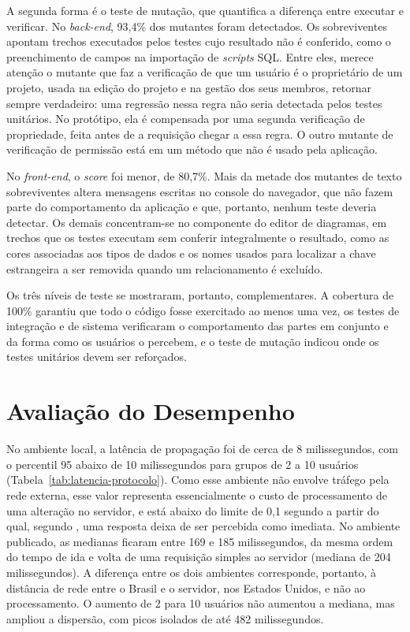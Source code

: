 A segunda forma é o teste de mutação, que quantifica a diferença entre executar e verificar. No \textit{back-end}, 93,4\% dos mutantes foram detectados. Os sobreviventes apontam trechos executados pelos testes cujo resultado não é conferido, como o preenchimento de campos na importação de \textit{scripts} SQL. Entre eles, merece atenção o mutante que faz a verificação de que um usuário é o proprietário de um projeto, usada na edição do projeto e na gestão dos seus membros, retornar sempre verdadeiro: uma regressão nessa regra não seria detectada pelos testes unitários. No protótipo, ela é compensada por uma segunda verificação de propriedade, feita antes de a requisição chegar a essa regra. O outro mutante de verificação de permissão está em um método que não é usado pela aplicação.

No \textit{front-end}, o \textit{score} foi menor, de 80,7\%. Mais da metade dos mutantes de texto sobreviventes altera mensagens escritas no console do navegador, que não fazem parte do comportamento da aplicação e que, portanto, nenhum teste deveria detectar. Os demais concentram-se no componente do editor de diagramas, em trechos que os testes executam sem conferir integralmente o resultado, como as cores associadas aos tipos de dados e os nomes usados para localizar a chave estrangeira a ser removida quando um relacionamento é excluído.

Os três níveis de teste se mostraram, portanto, complementares. A cobertura de 100\% garantiu que todo o código fosse exercitado ao menos uma vez, os testes de integração e de sistema verificaram o comportamento das partes em conjunto e da forma como os usuários o percebem, e o teste de mutação indicou onde os testes unitários devem ser reforçados.

\section{Avaliação do Desempenho}
\label{sec:avaliacao-desempenho}

No ambiente local, a latência de propagação foi de cerca de 8 milissegundos, com o percentil 95 abaixo de 10 milissegundos para grupos de 2 a 10 usuários (Tabela~\ref{tab:latencia-protocolo}). Como esse ambiente não envolve tráfego pela rede externa, esse valor representa essencialmente o custo de processamento de uma alteração no servidor, e está abaixo do limite de 0,1 segundo a partir do qual, segundo , uma resposta deixa de ser percebida como imediata. No ambiente publicado, as medianas ficaram entre 169 e 185 milissegundos, da mesma ordem do tempo de ida e volta de uma requisição simples ao servidor (mediana de 204 milissegundos). A diferença entre os dois ambientes corresponde, portanto, à distância de rede entre o Brasil e o servidor, nos Estados Unidos, e não ao processamento. O aumento de 2 para 10 usuários não aumentou a mediana, mas ampliou a dispersão, com picos isolados de até 482 milissegundos.

